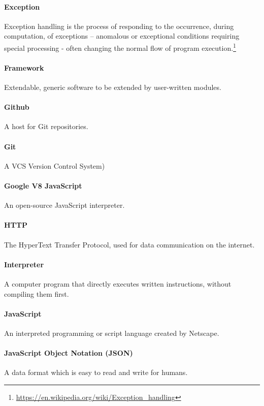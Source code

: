 \paragraph{Exception}
Exception handling is the process of responding to the occurrence, during computation, of exceptions – anomalous or exceptional conditions requiring special processing - often changing the normal flow of program execution.\footnote{\url{https://en.wikipedia.org/wiki/Exception_handling}}

\paragraph{Framework}
Extendable, generic software to be extended by user-written modules.

\paragraph{Github}
A host for Git repositories.

\paragraph{Git}
A VCS  Version Control System)

\paragraph{Google V8 JavaScript}
An open-source JavaScript interpreter.

\paragraph{HTTP}
The HyperText Transfer Protocol, used for data communication on the internet.

\paragraph{Interpreter}
A computer program that directly executes written instructions, without compiling them first.

\paragraph{JavaScript}
An interpreted programming or script language created by Netscape.

\paragraph{JavaScript Object Notation (JSON)}
A data format which is easy to read and write for humans.

